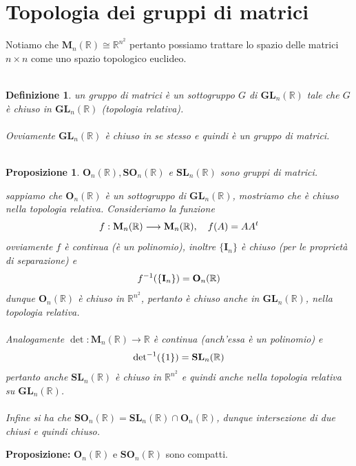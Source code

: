 \documentclass[oneside, 11pt]{amsbook}
\makeatletter
\newcommand{\0}{{(0)}}
\newcommand{\3}{{(3)}}
\theoremstyle{colonplain}
\newtheorem{prop}[thm]{Proposizione}
\theoremstyle{colondefinition}
\newtheorem{defn}[thm]{Definizione}
\theoremstyle{colonremark}
\numberwithin{equation}{chapter}
\renewcommand{\proofname}{Dimostrazione}
\renewenvironment{proof}[1][\proofname]{\par
  \pushQED{\qed}%
  \normalfont \topsep6\p@\@plus6\p@\relax
  \trivlist
  \item[\hskip\labelsep\bfseries #1:]\ignorespaces
}{%
  \popQED\endtrivlist\@endpefalse
}
\makeatother
\begin{document}
\section{Topologia dei gruppi di matrici}
Notiamo che $\mathbf{M}_n(\mathbb{R}) \cong \mathbb{R}^{n^2}$ pertanto possiamo trattare lo spazio delle matrici $n \times n$ come uno spazio topologico euclideo. \\ \\
\begin{defn} un \textit{gruppo di matrici} è un sottogruppo $G$ di $\mathbf{GL}_n(\mathbb{R})$ tale che $G$ è chiuso in $\mathbf{GL}_n(\mathbb{R})$ (topologia relativa). \\ \\
Ovviamente $\mathbf{GL}_n(\mathbb{R})$ è chiuso in se stesso e quindi è un gruppo di matrici. \\ \\
\end{defn}
\begin{prop} $\mathbf{O}_n(\mathbb{R}), \mathbf{SO}_n(\mathbb{R})$ e $\mathbf{SL}_n(\mathbb{R})$ sono gruppi di matrici. \\

\begin{proof} sappiamo che $\mathbf{O}_n(\mathbb{R})$ è un sottogruppo di $\mathbf{GL}_n(\mathbb{R})$, mostriamo che è chiuso nella topologia relativa. Consideriamo la funzione
\begin{align}
    f : \mathbf{M}_n(\mathbb{R}) \longrightarrow \mathbf{M}_n(\mathbb{R}), \quad f(A) = AA^t \notag
\end{align}
ovviamente $f$ è continua (è un polinomio), inoltre $\{ \mathbf{I}_n \}$ è chiuso (per le proprietà di separazione) e
\begin{align}
    f^{-1}(\{ \mathbf{I}_n \}) = \mathbf{O}_n(\mathbb{R}) \notag
\end{align}
dunque $\mathbf{O}_n(\mathbb{R})$ è chiuso in $\mathbb{R}^{n^2}$, pertanto è chiuso anche in $\mathbf{GL}_n(\mathbb{R})$, nella topologia relativa. \\ \\
Analogamente $\det : \mathbf{M}_n(\mathbb{R}) \longrightarrow \mathbb{R}$ è continua (anch'essa è un polinomio) e
\begin{align}
    \mathrm{det}^{-1}(\{ 1 \}) = \mathbf{SL}_n(\mathbb{R}) \notag
\end{align}
pertanto anche $\mathbf{SL}_n(\mathbb{R})$ è chiuso in $\mathbb{R}^{n^2}$ e quindi anche nella topologia relativa su $\mathbf{GL}_n(\mathbb{R})$. \\ \\
Infine si ha che $\mathbf{SO}_n(\mathbb{R}) = \mathbf{SL}_n(\mathbb{R}) \cap \mathbf{O}_n(\mathbb{R})$, dunque intersezione di due chiusi e quindi chiuso. \end{proof}
\end{prop}
\textbf{Proposizione:} $\mathbf{O}_n(\mathbb{R})$ e $\mathbf{SO}_n(\mathbb{R})$ sono compatti. \\
\end{document}
